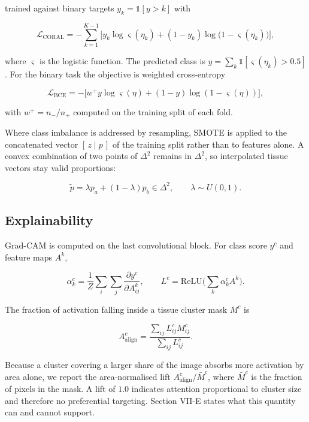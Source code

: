 trained against binary targets $y_k = \mathbb{1}[y > k]$ with

\begin{equation}
\mathcal{L}_{\text{CORAL}} = -\sum_{k=1}^{K-1}
\Big[ y_k \log \varsigma(\eta_k)
    + (1 - y_k) \log\big(1 - \varsigma(\eta_k)\big) \Big],
\label{eq:coralloss}
\end{equation}

where $\varsigma$ is the logistic function. The predicted class is
$\hat{y} = \sum_{k} \mathbb{1}[\varsigma(\eta_k) > 0.5]$. For the binary
task the objective is weighted cross-entropy

\begin{equation}
\mathcal{L}_{\text{BCE}} = -\big[ w^{+} y \log \varsigma(\eta)
    + (1-y) \log(1 - \varsigma(\eta)) \big],
\label{eq:bce}
\end{equation}

with $w^{+} = n_{-} / n_{+}$ computed on the training split of each fold.

Where class imbalance is addressed by resampling, SMOTE \cite{chawla2002}
is applied to the concatenated vector $[\,z \mid p\,]$ of the training
split rather than to features alone. A convex combination of two points of
$\Delta^{2}$ remains in $\Delta^{2}$, so interpolated tissue vectors stay
valid proportions:

\begin{equation}
\tilde{p} = \lambda p_a + (1-\lambda) p_b \in \Delta^{2},
\qquad \lambda \sim U(0,1).
\label{eq:smote}
\end{equation}

\subsection{Explainability}

Grad-CAM \cite{selvaraju2020} is computed on the last convolutional block.
For class score $y^{c}$ and feature maps $A^{k}$,

\begin{equation}
\alpha^{c}_{k} = \frac{1}{Z}\sum_{i}\sum_{j}
\frac{\partial y^{c}}{\partial A^{k}_{ij}},
\qquad
L^{c} = \mathrm{ReLU}\Big(\sum_{k} \alpha^{c}_{k} A^{k}\Big).
\label{eq:gradcam}
\end{equation}

The fraction of activation falling inside a tissue cluster mask $M^{c}$ is

\begin{equation}
A^{c}_{\text{align}} =
\frac{\sum_{ij} L^{c}_{ij} M^{c}_{ij}}{\sum_{ij} L^{c}_{ij}}.
\label{eq:align}
\end{equation}

Because a cluster covering a larger share of the image absorbs more
activation by area alone, we report the area-normalised lift
$A^{c}_{\text{align}} / \bar{M}^{c}$, where $\bar{M}^{c}$ is the fraction
of pixels in the mask. A lift of $1.0$ indicates attention proportional to
cluster size and therefore no preferential targeting. Section VII-E states
what this quantity can and cannot support.
